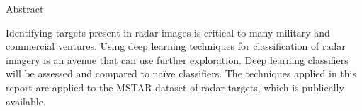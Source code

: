 \begin{centerpage}{Abstract}
 
 Identifying targets present in radar images is critical to many military and commercial ventures. Using deep learning techniques for classification of radar imagery is an avenue that can use further exploration. Deep learning classifiers will be assessed and compared to na\"ive classifiers. The techniques applied in this report are applied to the MSTAR dataset of radar targets, which is publically available.
\end{centerpage}
